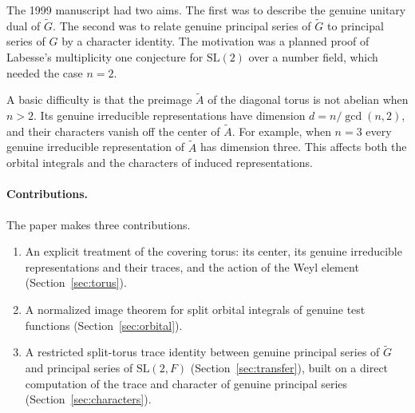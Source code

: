 \documentclass[12pt,letterpaper]{article}
\numberwithin{equation}{section}
\theoremstyle{plain}
\theoremstyle{definition}
\theoremstyle{remark}
\newcommand{\Gt}{\widetilde G}
\newcommand{\At}{\widetilde A}
\newcommand{\SL}{\mathrm{SL}}
\begin{document}
The 1999 manuscript had two aims. The first was to describe the
genuine unitary dual of $\Gt$. The second was to relate genuine
principal series of $\Gt$ to principal series of $G$ by a character
identity. The motivation was a planned proof of Labesse's
multiplicity one conjecture for $\SL(2)$ over a number field, which
needed the case $n=2$.

A basic difficulty is that the preimage $\At$ of the diagonal torus is
not abelian when $n>2$. Its genuine irreducible representations have
dimension $d=n/\gcd(n,2)$, and their characters vanish off the center
of $\At$. For example, when $n=3$ every genuine irreducible
representation of $\At$ has dimension three. This affects both the
orbital integrals and the characters of induced representations.

\paragraph{Contributions.} The paper makes three contributions.
\begin{enumerate}[label=(\Alph*),leftmargin=*]
\item An explicit treatment of the covering torus: its center, its
  genuine irreducible representations and their traces, and the action
  of the Weyl element (Section~\ref{sec:torus}).
\item A normalized image theorem for split orbital integrals of genuine
  test functions (Section~\ref{sec:orbital}).
\item A restricted split-torus trace identity between genuine principal
  series of $\Gt$ and principal series of $\SL(2,F)$
  (Section~\ref{sec:transfer}), built on a direct computation of the
  trace and character of genuine principal series
  (Section~\ref{sec:characters}).
\end{enumerate}
\end{document}
